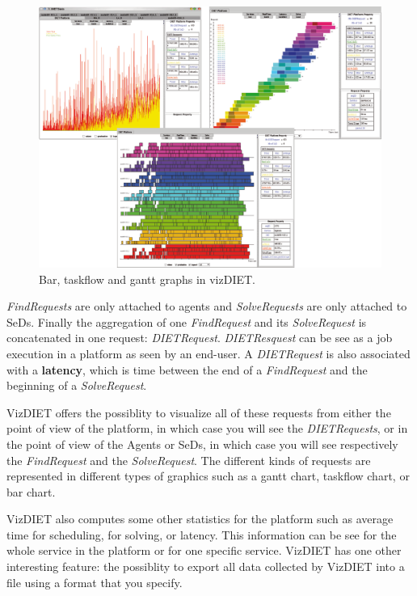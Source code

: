 \begin{figure}[htb]
  \begin{center}
    \includegraphics[scale=0.4]{fig/VizDIET_screenshot_2}
    \caption{Bar, taskflow and gantt graphs in vizDIET.}
    \label{fig:vizStats}
  \end{center}
\end{figure}

  \textit{FindRequests} are only attached to agents and \textit{SolveRequests}
  are only attached to SeDs. Finally the aggregation of one
  \textit{FindRequest} and its \textit{SolveRequest} is concatenated in one
  request: \textit{DIETRequest}. \textit{DIETResquest} can be see as a job
  execution in a \diet platform as seen by an end-user. A \textit{DIETRequest}
  is also associated with a  \textbf{latency}, which is time between the end of
  a \textit{FindRequest} and the beginning of a \textit{SolveRequest}.

VizDIET offers the possiblity to visualize all of these requests from  either
the point of view of the \diet platform, in which case you will see the
\textit{DIETRequests}, or in the point of view of the Agents or SeDs, in which
case you will see respectively the \textit{FindRequest} and the
\textit{SolveRequest}. The different kinds of requests are represented in
different types of graphics such as a gantt chart, taskflow chart, or bar
chart.

VizDIET also computes some other statistics for the platform such as average
time for scheduling, for solving, or latency. This information can be see for
the whole service in the platform or for one specific service. VizDIET has one
other interesting feature: the possiblity to export all data collected by
VizDIET into a file using a format that you specify.

